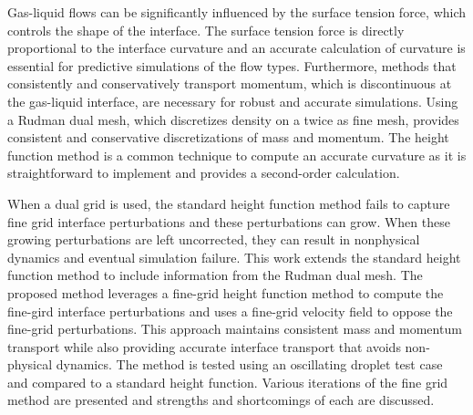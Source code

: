 
Gas-liquid flows can be significantly influenced by the surface tension force, which controls the shape of the interface. The surface tension force is directly proportional to the interface curvature and an accurate calculation of curvature is essential for predictive simulations of the flow types. Furthermore, methods that consistently and conservatively transport momentum, which is discontinuous at the gas-liquid interface, are necessary for robust and accurate simulations. Using a Rudman dual mesh, which discretizes density on a twice as fine mesh, provides consistent and conservative discretizations of mass and momentum. The height function method is a common technique to compute an accurate curvature as it is straightforward to implement and provides a second-order calculation. 

When a dual grid is used, the standard height function method fails to capture fine grid interface perturbations and these perturbations can grow. When these growing perturbations are left uncorrected, they can result in nonphysical dynamics and eventual simulation failure. This work extends the standard height function method to include information from the Rudman dual mesh. The proposed method leverages a fine-grid height function method to compute the fine-gird interface perturbations and uses a fine-grid velocity field to oppose the fine-grid perturbations. This approach maintains consistent mass and momentum transport while also providing accurate interface transport that avoids non-physical dynamics. The method is tested using an oscillating droplet test case and compared to a standard height function. Various iterations of the fine grid method are presented and strengths and shortcomings of each are discussed. 